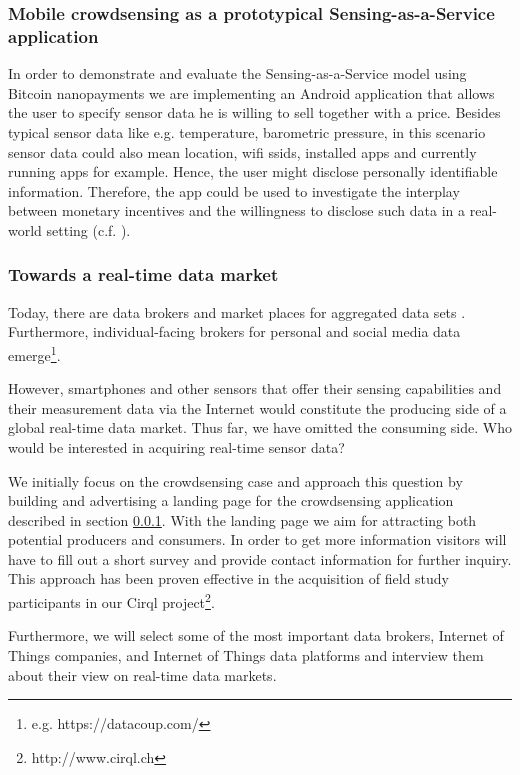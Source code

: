 \documentclass[a4paper, 12pt]{scrartcl}
\begin{document}
\subsubsection{Mobile crowdsensing as a prototypical Sensing-as-a-Service application}
\label{subsubsec:app}

In order to demonstrate and evaluate the Sensing-as-a-Service model using Bitcoin nanopayments we are implementing an Android application that allows the user to specify sensor data he is willing to sell together with a price. Besides typical sensor data like e.g. temperature, barometric pressure, in this scenario sensor data could also mean location, wifi ssids, installed apps and currently running apps for example. Hence, the user might disclose personally identifiable information. Therefore, the app could be used to investigate the interplay between monetary incentives and the willingness to disclose such data in a real-world setting (c.f. \parencite{Staiano:2014jm}). 

\subsubsection{Towards a real-time data market}

Today, there are data brokers and market places for aggregated data sets \parencite{schomm2013marketplaces,stahl2014data}. Furthermore, individual-facing brokers for personal and social media data emerge\footnote{e.g. https://datacoup.com/}.

However, smartphones and other sensors that offer their sensing capabilities and their measurement data via the Internet would constitute the producing side of a global real-time data market. Thus far, we have omitted the consuming side. Who would be interested in acquiring real-time sensor data?

We initially focus on the crowdsensing case and approach this question by building and advertising a landing page for the crowdsensing application described in section \ref{subsubsec:app}. With the landing page we aim for attracting both potential producers and consumers. In order to get more information visitors will have to fill out a short survey and provide contact information for further inquiry.
This approach has been proven effective in the acquisition of field study participants in our Cirql project\footnote{http://www.cirql.ch}.

Furthermore, we will select some of the most important data brokers, Internet of Things companies, and Internet of Things data platforms and interview them about their view on real-time data markets.
\end{document}
